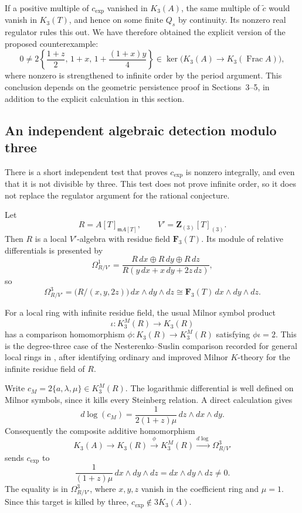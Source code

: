 \documentclass[11pt,a4paper]{article}
\theoremstyle{remark}
\newcommand{\Z}{\mathbf Z}
\newcommand{\F}{\mathbf F}
\newcommand{\m}{\mathfrak m}
\newcommand{\Frac}{\operatorname{Frac}}
\begin{document}
If a positive multiple of $c_{\mathrm{exp}}$ vanished in $K_3(A)$, the same multiple of $\widetilde c$ would vanish in $K_3(T)$, and hence on some finite $Q_s$ by continuity. Its nonzero real regulator rules this out. We have therefore obtained the explicit version of the proposed counterexample:
\begin{equation}\label{eq:explicitconclusion}
\boxed{\quad
0\neq 2\left\{\frac{1+z}{2},\,1+x,\,
1+\frac{(1+x)y}{4}\right\}\in
\ker\bigl(K_3(A)\longrightarrow K_3(\Frac A)\bigr),
\quad}
\end{equation}
where nonzero is strengthened to infinite order by the period argument. This conclusion depends on the geometric persistence proof in Sections~3--5, in addition to the explicit calculation in this section.

\subsection{An independent algebraic detection modulo three}\label{sec:modthree}

There is a short independent test that proves $c_{\mathrm{exp}}$ is nonzero integrally, and even that it is not divisible by three. This test does not prove infinite order, so it does not replace the regulator argument for the rational conjecture.

Let
\[
R=A[T]_{\m A[T]},\qquad V'=\Z_{(3)}[T]_{(3)}.
\]
Then $R$ is a local $V'$-algebra with residue field $\F_3(T)$. Its module of relative differentials is presented by
\[
\Omega^1_{R/V'}=
\frac{R\,dx\oplus R\,dy\oplus R\,dz}
 {R(y\,dx+x\,dy+2z\,dz)},
\]
so
\[
\Omega^3_{R/V'}=
\bigl(R/(x,y,2z)\bigr)\,dx\wedge dy\wedge dz
\cong\F_3(T)\,dx\wedge dy\wedge dz.
\]

For a local ring with infinite residue field, the usual Milnor symbol product
\[
\iota:K^M_3(R)\longrightarrow K_3(R)
\]
has a comparison homomorphism $\phi:K_3(R)\to K^M_3(R)$ satisfying $\phi\iota=2$. This is the degree-three case of the Nesterenko--Suslin comparison recorded for general local rings in \cite[Proposition~4.2.8(5),(6)]{KerzThesis}, after identifying ordinary and improved Milnor $K$-theory for the infinite residue field of $R$.

Write $c_M=2\{a,\lambda,\mu\}\in K^M_3(R)$. The logarithmic differential is well defined on Milnor symbols, since it kills every Steinberg relation. A direct calculation gives
\[
d\log(c_M)
=\frac{1}{2(1+z)\mu}\,dz\wedge dx\wedge dy.
\]
Consequently the composite additive homomorphism
\[
K_3(A)\longrightarrow K_3(R)
\xrightarrow{\phi}K^M_3(R)
\xrightarrow{d\log}\Omega^3_{R/V'}
\]
sends $c_{\mathrm{exp}}$ to
\[
\frac{1}{(1+z)\mu}\,dx\wedge dy\wedge dz
=dx\wedge dy\wedge dz\neq0.
\]
The equality is in $\Omega^3_{R/V'}$, where $x,y,z$ vanish in the coefficient ring and $\mu=1$. Since this target is killed by three, $c_{\mathrm{exp}}\notin3K_3(A)$.
\end{document}
